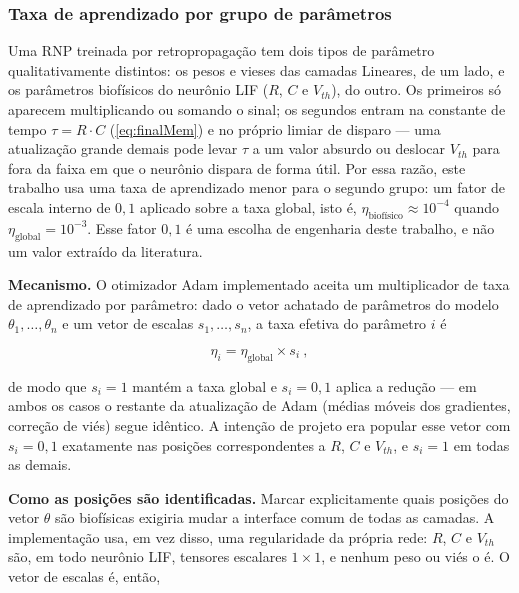 			\subsubsection{Taxa de aprendizado por grupo de parâmetros}
				\label{sec:snnLrScale}

				\par Uma RNP treinada por retropropagação tem dois tipos de parâmetro qualitativamente distintos: os pesos e vieses das camadas Lineares, de um lado, e os parâmetros biofísicos do neurônio LIF ($R$, $C$ e $V_{th}$), do outro. Os primeiros só aparecem multiplicando ou somando o sinal; os segundos entram na constante de tempo $\tau=R\cdot C$ (\autoref{eq:finalMem}) e no próprio limiar de disparo --- uma atualização grande demais pode levar $\tau$ a um valor absurdo ou deslocar $V_{th}$ para fora da faixa em que o neurônio dispara de forma útil. Por essa razão, este trabalho usa uma taxa de aprendizado menor para o segundo grupo: um fator de escala interno de $0{,}1$ aplicado sobre a taxa global, isto é, $\eta_{\text{biofísico}} \approx 10^{-4}$ quando $\eta_{\text{global}} = 10^{-3}$. Esse fator $0{,}1$ é uma escolha de engenharia deste trabalho, e não um valor extraído da literatura.

				\par \textbf{Mecanismo.} O otimizador Adam implementado aceita um multiplicador de taxa de aprendizado por parâmetro: dado o vetor achatado de parâmetros do modelo $\theta_1,\dots,\theta_n$ e um vetor de escalas $s_1,\dots,s_n$, a taxa efetiva do parâmetro $i$ é

				\begin{equation}
					\label{eq:lrscale}
					\eta_i = \eta_{\text{global}} \times s_i \: ,
				\end{equation}

				\par de modo que $s_i=1$ mantém a taxa global e $s_i=0{,}1$ aplica a redução --- em ambos os casos o restante da atualização de Adam (médias móveis dos gradientes, correção de viés) segue idêntico. A intenção de projeto era popular esse vetor com $s_i=0{,}1$ exatamente nas posições correspondentes a $R$, $C$ e $V_{th}$, e $s_i=1$ em todas as demais.

				\par \textbf{Como as posições são identificadas.} Marcar explicitamente quais posições do vetor $\theta$ são biofísicas exigiria mudar a interface comum de todas as camadas. A implementação usa, em vez disso, uma regularidade da própria rede: $R$, $C$ e $V_{th}$ são, em todo neurônio LIF, tensores escalares $1\times1$, e nenhum peso ou viés o é. O vetor de escalas é, então,

